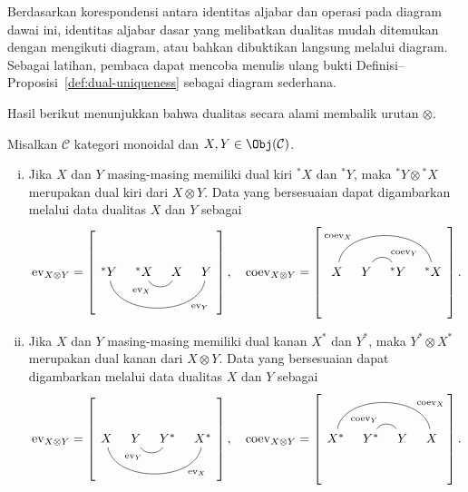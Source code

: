 Berdasarkan korespondensi antara identitas aljabar dan operasi pada diagram
dawai ini, identitas aljabar dasar yang melibatkan dualitas mudah ditemukan
dengan mengikuti diagram, atau bahkan dibuktikan langsung melalui diagram.
Sebagai latihan, pembaca dapat mencoba menulis ulang bukti
Definisi--Proposisi~\ref{def:dual-uniqueness} sebagai diagram sederhana.

Hasil berikut menunjukkan bahwa dualitas secara alami membalik urutan
$\otimes$.

\begin{proposition}
	Misalkan $\mathcal{C}$ kategori monoidal dan
	$X,Y\in\Obj(\mathcal{C})$.
	\begin{enumerate}[(i)]
		\item Jika $X$ dan $Y$ masing-masing memiliki dual kiri ${}^*X$ dan
		${}^*Y$, maka ${}^*Y\otimes{}^*X$ merupakan dual kiri dari
		$X\otimes Y$. Data yang bersesuaian dapat digambarkan melalui data
		dualitas $X$ dan $Y$ sebagai
		\begin{equation*}
			\mathrm{ev}_{X \otimes Y} = \left[ \begin{tikzcd}[column sep=tiny, ampersand replacement=\&]
				{}^* Y \arrow[dash, rrr, bend right=80, "{\mathrm{ev}_Y}"' near end] \& {}^* X \arrow[dash, r, bend right=60, "{\mathrm{ev}_X}"' near start] \& X \& Y
			\end{tikzcd}\right], \quad
			\mathrm{coev}_{X \otimes Y} = \left[ \begin{tikzcd}[column sep=tiny, ampersand replacement=\&]
				X \arrow[dash, rrr, bend left=80, "{\mathrm{coev}_X}" near start] \& Y \arrow[dash, r, bend left=60, "{\mathrm{coev}_Y}" near end] \& {}^* Y \& {}^* X
			\end{tikzcd}\right].
		\end{equation*}
		\item Jika $X$ dan $Y$ masing-masing memiliki dual kanan $X^*$ dan
		$Y^*$, maka $Y^*\otimes X^*$ merupakan dual kanan dari $X\otimes Y$.
		Data yang bersesuaian dapat digambarkan melalui data dualitas $X$ dan $Y$
		sebagai
		\begin{equation*}
			\mathrm{ev}_{X \otimes Y} = \left[ \begin{tikzcd}[column sep=tiny, ampersand replacement=\&]
				X \arrow[dash, rrr, bend right=80, "{\mathrm{ev}_X}"' near end] \& Y \arrow[dash, r, bend right=60, "{\mathrm{ev}_Y}"' near start] \& Y^* \& X^*
			\end{tikzcd}\right], \quad
			\mathrm{coev}_{X \otimes Y} = \left[ \begin{tikzcd}[column sep=tiny, ampersand replacement=\&]
				X^* \arrow[dash, rrr, bend left=80, "{\mathrm{coev}_X}" near end] \& Y^* \arrow[dash, r, bend left=60, "{\mathrm{coev}_Y}" near start] \& Y \& X
			\end{tikzcd}\right].
		\end{equation*}
	\end{enumerate}
\end{proposition}

